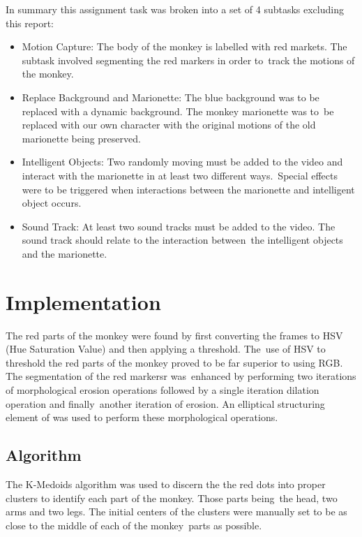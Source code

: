 \documentclass[12pt,a4paper]{article}
\begin{document}
      In summary this assignment task was broken into a set of 4  subtasks excluding this report:
      \begin{itemize}
        \item Motion Capture: The body of the monkey is labelled with red markets. The subtask involved segmenting the red markers in order to\
        track the motions of the monkey.
        \item Replace Background and Marionette: The blue background was to be replaced with a dynamic background. The monkey marionette was to\
        be replaced with our own character with the original motions of the old marionette being preserved.
        \item Intelligent Objects: Two randomly moving must be added to the video and interact with the marionette in at least two different ways.\
        Special effects were to be triggered when interactions between the marionette and intelligent object occurs.
        \item Sound Track: At least two sound tracks must be added to the video. The sound track should relate to the interaction between\
        the intelligent objects and the marionette.
      \end{itemize}

    \section{Implementation}
    The red parts of the monkey were found by first converting the frames to HSV (Hue Saturation Value) and then applying a threshold. The\
    use of HSV to threshold the red parts of the monkey proved to be far superior to using RGB. The segmentation of the red markersr was\
    enhanced by performing two iterations of morphological erosion operations followed by a single iteration dilation operation and finally\
    another iteration of erosion. An elliptical structuring element of was used to perform these morphological operations.

      \subsection{Algorithm}
      The K-Medoids algorithm was used to discern the the red dots into proper clusters to identify each part of the monkey. Those parts being\
      the head, two arms and two legs. The initial centers of the clusters were manually set to be as close to the middle of each of the monkey\
      parts as possible.
\end{document}
